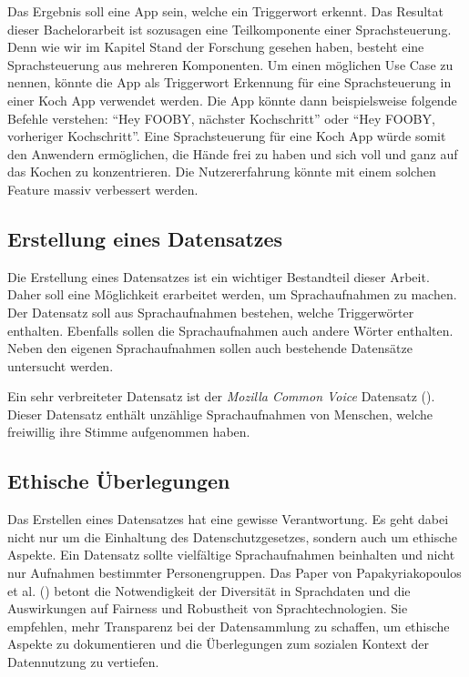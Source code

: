 \documentclass[11pt,a4paper]{article}
\begin{document}
\noindent \newline
Das Ergebnis soll eine App sein, welche ein Triggerwort erkennt. Das Resultat dieser Bachelorarbeit
ist sozusagen eine Teilkomponente einer Sprachsteuerung. Denn wie wir im Kapitel Stand der Forschung
gesehen haben, besteht eine Sprachsteuerung aus mehreren Komponenten. Um einen möglichen Use Case
zu nennen, könnte die App als Triggerwort Erkennung für eine Sprachsteuerung in einer Koch App
verwendet werden. Die App könnte dann beispielsweise folgende Befehle verstehen: ``Hey FOOBY, 
nächster Kochschritt'' oder ``Hey FOOBY, vorheriger Kochschritt''. Eine Sprachsteuerung für eine Koch App
würde somit den Anwendern ermöglichen, die Hände frei zu haben und sich voll und ganz auf das
Kochen zu konzentrieren. Die Nutzererfahrung könnte mit einem solchen Feature massiv verbessert
werden.

\subsection{Erstellung eines Datensatzes}
Die Erstellung eines Datensatzes ist ein wichtiger Bestandteil dieser Arbeit. Daher soll eine 
Möglichkeit erarbeitet werden, um Sprachaufnahmen zu machen. Der Datensatz soll aus Sprachaufnahmen
bestehen, welche Triggerwörter enthalten. Ebenfalls sollen die Sprachaufnahmen auch andere Wörter
enthalten. Neben den eigenen Sprachaufnahmen sollen auch bestehende Datensätze untersucht werden.

\noindent \newline
Ein sehr verbreiteter Datensatz ist der \textit{Mozilla Common Voice} Datensatz
(\cite{ardila2020common}). Dieser Datensatz enthält unzählige Sprachaufnahmen von Menschen, welche
freiwillig ihre Stimme aufgenommen haben. 

\subsection{Ethische Überlegungen}
Das Erstellen eines Datensatzes hat eine gewisse Verantwortung. Es geht dabei nicht nur um die 
Einhaltung des Datenschutzgesetzes, sondern auch um ethische Aspekte. Ein Datensatz sollte 
vielfältige Sprachaufnahmen beinhalten und nicht nur Aufnahmen bestimmter Personengruppen. Das 
Paper von Papakyriakopoulos et al. (\cite{papakyriakopoulos2023augmented}) betont die 
Notwendigkeit der Diversität in Sprachdaten und die Auswirkungen auf Fairness und Robustheit von 
Sprachtechnologien. Sie empfehlen, mehr Transparenz bei der Datensammlung zu schaffen, um ethische 
Aspekte zu dokumentieren und die Überlegungen zum sozialen Kontext der Datennutzung zu vertiefen.
\end{document}
